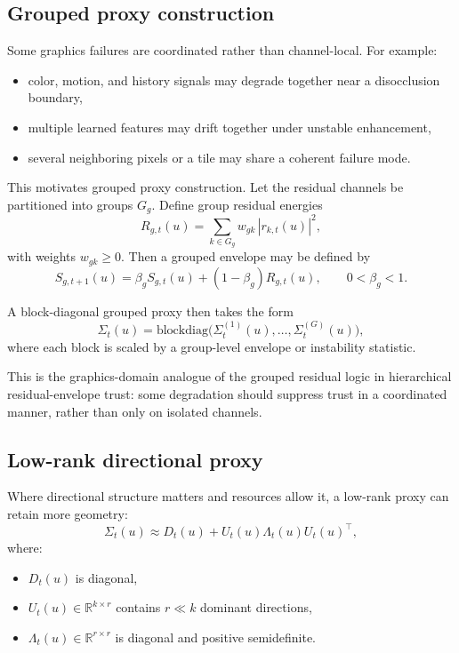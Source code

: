 \documentclass[11pt,letterpaper]{article}
\theoremstyle{gcresult}
\theoremstyle{definition}
\begin{document}

\subsection{Grouped proxy construction}

Some graphics failures are coordinated rather than channel-local. For example:
\begin{itemize}[leftmargin=1.5em]
    \item color, motion, and history signals may degrade together near a disocclusion boundary,
    \item multiple learned features may drift together under unstable enhancement,
    \item several neighboring pixels or a tile may share a coherent failure mode.
\end{itemize}

This motivates grouped proxy construction. Let the residual channels be partitioned into groups $G_g$. Define group residual energies
\begin{equation}
R_{g,t}(u)=\sum_{k\in G_g} w_{gk}\,|r_{k,t}(u)|^2,
\end{equation}
with weights $w_{gk}\ge 0$. Then a grouped envelope may be defined by
\begin{equation}
S_{g,t+1}(u)=\beta_g S_{g,t}(u) + (1-\beta_g)R_{g,t}(u),
\qquad 0<\beta_g<1.
\end{equation}

A block-diagonal grouped proxy then takes the form
\begin{equation}
\Sigma_t(u)=\mathrm{blockdiag}\!\bigl(
\Sigma^{(1)}_t(u),\dots,\Sigma^{(G)}_t(u)
\bigr),
\end{equation}
where each block is scaled by a group-level envelope or instability statistic.

This is the graphics-domain analogue of the grouped residual logic in hierarchical residual-envelope trust: some degradation should suppress trust in a coordinated manner, rather than only on isolated channels.


\subsection{Low-rank directional proxy}

Where directional structure matters and resources allow it, a low-rank proxy can retain more geometry:
\begin{equation}
\Sigma_t(u)\approx D_t(u)+U_t(u)\Lambda_t(u)U_t(u)^\top,
\end{equation}
where:
\begin{itemize}[leftmargin=1.5em]
    \item $D_t(u)$ is diagonal,
    \item $U_t(u)\in\mathbb{R}^{k\times r}$ contains $r\ll k$ dominant directions,
    \item $\Lambda_t(u)\in\mathbb{R}^{r\times r}$ is diagonal and positive semidefinite.
\end{itemize}
\end{document}
